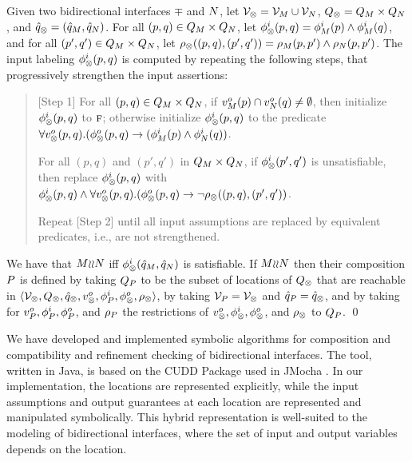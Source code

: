 \begin{algo}{}
\label{algo-ag-comp} 
Given two bidirectional interfaces $\mp$ and $N$, let 
${\cal V}_\otimes = {\cal V}_M \cup {\cal V}_N$, 
$Q_\otimes = Q_M \times Q_N$, 
and $\hat{q}_\otimes = (\hat{q}_M,\hat{q}_N)$. 
For all $(p,q) \in Q_M \times Q_N$, 
let $\phi^i_\otimes(p,q) = \phi^i_M(p) \wedge \phi^i_M(q)$,  
and for all $(p',q') \in Q_M \times Q_N$, let 
$\rho_\otimes ((p,q), (p',q')) = \rho_M (p,p') \wedge \rho_N(p,p')$. 
The input labeling $\phi^i_\otimes(p,q)$ is computed by repeating the
following steps, that progressively strengthen the input assertions: 
%
\begin{quote}
[Step 1] For all $(p,q) \in Q_M \times Q_N$, 
if $v^o_M(p) \cap v^o_N(q) \neq \emptyset$, 
then initialize $\phi^i_\otimes(p,q)$ to $\mbox{\sc f}$; 
otherwise initialize $\phi^i_\otimes(p,q)$ to the predicate 
$\forall v^o_\otimes (p,q) . 
  (\phi^o_\otimes (p,q) \rightarrow (\phi^i_M (p) \wedge \phi^i_N (q))$. 

\medskip \noindent 
[Step 2]
For all $(p,q)$ and $(p',q')$ in $Q_M \times Q_N$, 
if $\phi^i_\otimes(p',q')$ is unsatisfiable, then replace 
$\phi^i_\otimes(p,q)$ with 
$\phi^i_\otimes(p,q) \wedge \forall v^o_\otimes (p,q) . 
  (\phi^o_\otimes (p,q) \rightarrow \neg \rho_\otimes((p,q),(p',q'))$. 

\medskip \noindent 
Repeat [Step 2] until all input assumptions are replaced by equivalent
predicates, i.e., are not strengthened. 

\end{quote}
%
We have that $M {\wr}{\wr} N$ iff 
$\phi^i_\otimes(\hat{q}_M,\hat{q}_N)$ is satisfiable.  
If $M{\wr}{\wr}N$ then their composition $P$ is defined by taking
$Q_P$ to be the subset of locations of $Q_\otimes$ that are reachable
in  
$\langle {\cal V}_\otimes,Q_\otimes,\hat{q}_\otimes,v^o_\otimes,
\phi^i_P,\phi^o_\otimes,\rho_\otimes \rangle$, 
by taking ${\cal V}_P = {\cal V}_\otimes$ 
and $\hat{q}_P = \hat{q}_\otimes$, 
and by taking for $v^o_P,\phi^i_P,\phi^o_P$, and $\rho_P$ 
the restrictions of 
$v^o_\otimes,\phi^i_\otimes,\phi^o_\otimes$, and $\rho_\otimes$ 
to $Q_P$.
\qed
\end{algo}

\noindent
We have developed and implemented symbolic algorithms for composition and 
compatibility and refinement checking of bidirectional interfaces.
The tool, written in Java, is based on the CUDD Package used in
JMocha \cite{Mocha2001}. 
In our implementation, the locations are represented
explicitly, while the input assumptions and output guarantees at each
location are represented and manipulated symbolically. 
This hybrid representation is well-suited to the modeling of
bidirectional interfaces, where the set of input and output
variables depends on the location. 

